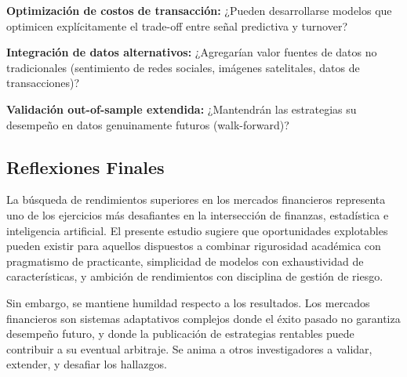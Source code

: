 \documentclass[11pt,a4paper]{article}
\begin{document}
\textbf{Optimización de costos de transacción:} ¿Pueden desarrollarse modelos que optimicen explícitamente el trade-off entre señal predictiva y turnover?

\textbf{Integración de datos alternativos:} ¿Agregarían valor fuentes de datos no tradicionales (sentimiento de redes sociales, imágenes satelitales, datos de transacciones)?

\textbf{Validación out-of-sample extendida:} ¿Mantendrán las estrategias su desempeño en datos genuinamente futuros (walk-forward)?

\subsection{Reflexiones Finales}

La búsqueda de rendimientos superiores en los mercados financieros representa uno de los ejercicios más desafiantes en la intersección de finanzas, estadística e inteligencia artificial. El presente estudio sugiere que oportunidades explotables pueden existir para aquellos dispuestos a combinar rigurosidad académica con pragmatismo de practicante, simplicidad de modelos con exhaustividad de características, y ambición de rendimientos con disciplina de gestión de riesgo.

Sin embargo, se mantiene humildad respecto a los resultados. Los mercados financieros son sistemas adaptativos complejos donde el éxito pasado no garantiza desempeño futuro, y donde la publicación de estrategias rentables puede contribuir a su eventual arbitraje. Se anima a otros investigadores a validar, extender, y desafiar los hallazgos.

\newpage

\end{document}
